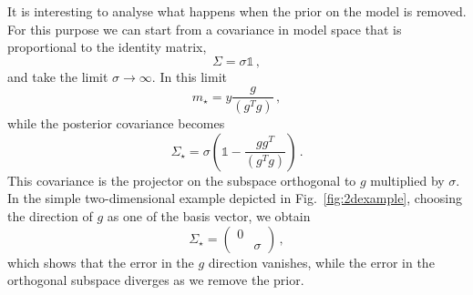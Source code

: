 It is interesting to analyse what happens when the prior on the model is
removed. For this purpose we can start from a covariance in model space that is
proportional to the identity matrix, 
\begin{equation}
  \label{eq:DiagCovSigma}
  \Sigma = \sigma \mathbb{1}\, ,
\end{equation}
and take the limit $\sigma \to \infty$. In this limit
\begin{equation}
  \label{eq:LargeSigmaLimit}
  m_\star = y \frac{g}{(g^T g)}\, ,
\end{equation}
while the posterior covariance becomes
\begin{equation}
  \label{eq:ExplcitCov}
  \Sigma_\star= \sigma \left(
    \mathbb{1} - \frac{g g^T}{(g^T g)}
  \right)\, .
\end{equation}
This covariance is the projector on the subspace orthogonal to $g$ multiplied by
$\sigma$. In the simple two-dimensional example depicted in
Fig.~\ref{fig:2dexample}, choosing the direction of $g$ as one of the basis
vector, we obtain
\begin{equation}
  \label{eq:ExplCovTwo}
  \Sigma_\star = 
  \begin{pmatrix}
    0 & \\
    & \sigma
  \end{pmatrix}\, ,
\end{equation}
which shows that the error in the $g$ direction vanishes, while the error in the
orthogonal subspace diverges as we remove the prior. 

